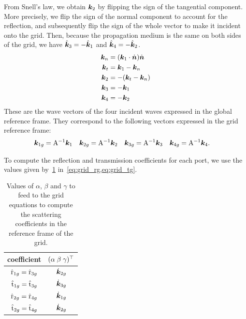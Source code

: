 From Snell's law, we obtain $\bm{k}_2$ by flipping the sign of the tangential component.
More precisely, we flip the sign of the normal component to account for the reflection, and subsequently flip the sign of the whole vector to make it incident onto the grid.
Then, because the propagation medium is the same on both sides of the grid, we have
$\hat{\bm{k}}_3 = -\hat{\bm{k}}_1$ and
$\hat{\bm{k}}_4 = -\hat{\bm{k}}_2$.
\begin{align}
    \bm{k}_n &= (\bm{k}_1 \cdot \dot{\bm{n}}) \dot{\bm{n}} \\
    \bm{k}_t &= \bm{k}_1 - \bm{k}_n                \\
    \bm{k}_2 &= -(\bm{k}_t - \bm{k}_n)             \\
    \bm{k}_3 &= -\bm{k}_1                            \\
    \bm{k}_4 &= -\bm{k}_2
\end{align}
These are the wave vectors of the four incident waves expressed in the global reference frame.
They correspond to the following vectors expressed in the grid reference frame:
\begin{align}
    \bm{k}_{1g} &= \mathrm{A}^{-1} \bm{k}_1 &
    \bm{k}_{2g} &= \mathrm{A}^{-1} \bm{k}_2 &
    \bm{k}_{3g} &= \mathrm{A}^{-1} \bm{k}_3 &
    \bm{k}_{4g} &= \mathrm{A}^{-1} \bm{k}_4
    \text{.}
\end{align}

To compute the reflection and transmission coefficients for each port, we use the values given by~\cref{tab:grid_values}
in~\cref{eq:grid_rg,eq:grid_tg}.
\begin{table}
    \centering
    \begin{tabular}{cc}
        \toprule
        coefficient                         & $(\alpha \; \beta \; \gamma)^\top$ \\
        \midrule
        $\hat{\mathrm{r}}_{1g} = \hat{\mathrm{r}}_{3g}$ & $\dot{\bm{k}}_{2g}$ \\
        $\hat{\mathrm{t}}_{1g} = \hat{\mathrm{t}}_{3g}$ & $\dot{\bm{k}}_{3g}$ \\
        $\hat{\mathrm{r}}_{2g} = \hat{\mathrm{r}}_{4g}$ & $\dot{\bm{k}}_{1g}$ \\
        $\hat{\mathrm{t}}_{2g} = \hat{\mathrm{t}}_{4g}$ & $\dot{\bm{k}}_{2g}$ \\
        \bottomrule
    \end{tabular}
    \caption{
        Values of $\alpha$, $\beta$ and $\gamma$
        to feed to the grid equations to compute the scattering coefficients in the reference frame of the grid.
    }
    \label{tab:grid_values}
\end{table}


